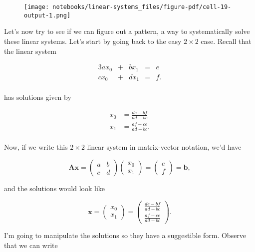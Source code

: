 \documentclass[
  letterpaper,
  DIV=11,
  numbers=noendperiod]{scrreprt}
\begin{document}
\begin{figure}[H]

{\centering \texttt{[image: notebooks/linear-systems\_files/figure-pdf/cell-19-output-1.png]}

}

\end{figure}

Let's now try to see if we can figure out a pattern, a way to
systematically solve these linear systems. Let's start by going back to
the easy \(2 \times 2\) case. Recall that the linear system

\begin{alignat*}{3}
   ax_0 & {}+{} &  bx_1 & {}={} & e \\
   cx_0 & {}+{} &  dx_1 & {}={} & f. \\
\end{alignat*}

has solutions given by

\begin{align*}
x_0 &= \frac{de-bf}{ad-bc} \\
x_1 &= \frac{af-ce}{ad-bc}. \\
\end{align*}

Now, if we write this \(2 \times 2\) linear system in matrix-vector
notation, we'd have

\[
\mathbf{A}\mathbf{x} = 
\begin{pmatrix}
a & b \\
c & d
\end{pmatrix}
\begin{pmatrix}
x_0 \\
x_1
\end{pmatrix} =
\begin{pmatrix}
e \\
f
\end{pmatrix}
= \mathbf{b},
\]

and the solutions would look like

\[
\mathbf{x} = 
\begin{pmatrix}
x_0 \\
x_1
\end{pmatrix} =
\begin{pmatrix}
\frac{de-bf}{ad-bc} \\
\frac{af-ce}{ad-bc}
\end{pmatrix}.
\]

I'm going to manipulate the solutions so they have a suggestible form.
Observe that we can write
\end{document}
